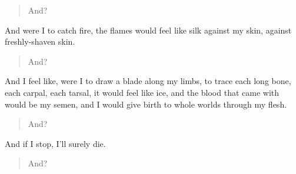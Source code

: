 \begin{quote}
And?
\end{quote}

And were I to catch fire, the flames would feel like silk against my skin, against freshly-shaven skin.

\begin{quote}
And?
\end{quote}

And I feel like, were I to draw a blade along my limbs, to trace each long bone, each carpal, each tarsal, it would feel like ice, and the blood that came with would be my semen, and I would give birth to whole worlds through my flesh.

\begin{quote}
And?
\end{quote}

And if I stop, I'll surely die.

\begin{quote}
And?
\end{quote}
